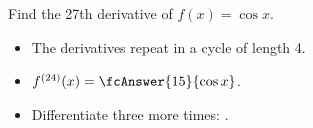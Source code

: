 \begin{frame}
\begin{example}
Find the 27th derivative of $f(x) = \cos x$.
%
\begin{itemize}
\item<13->  The derivatives repeat in a cycle of length 4.
\item<14-| alert@14-15>  $f^{(24)}(x) = \fcAnswer{15}{\cos x}$.
\item<16->  Differentiate three more times: .
\end{itemize}
\end{example}
\end{frame}

